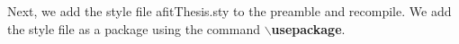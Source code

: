 Next, we add the style file afitThesis.sty to the preamble and
recompile.  We add the style file as a package using the command {\bf
$\backslash$usepackage}.
